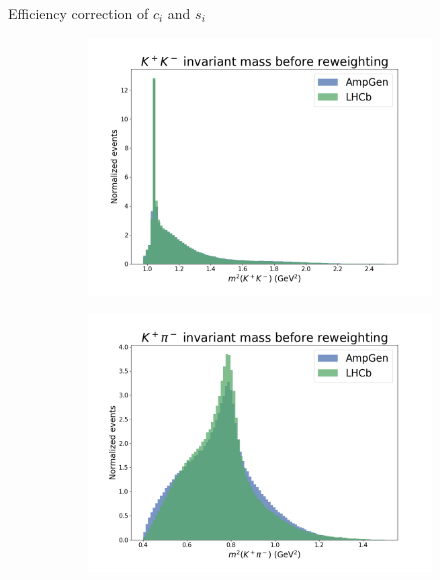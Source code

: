 \documentclass{beamer}
\begin{document}
\begin{frame}{Efficiency correction of $c_i$ and $s_i$}
  \begin{figure}
    \centering
    \begin{subfigure}{0.33\textwidth}
      \includegraphics[width = 1.0\textwidth]{Plots/s01_BeforeReweighting.png}
    \end{subfigure}%
    \begin{subfigure}{0.33\textwidth}
      \includegraphics[width = 1.0\textwidth]{Plots/s03_BeforeReweighting.png}
    \end{subfigure}%
    \begin{subfigure}{0.33\textwidth}

\end{subfigure}
\end{figure}
\end{frame}
\end{document}
